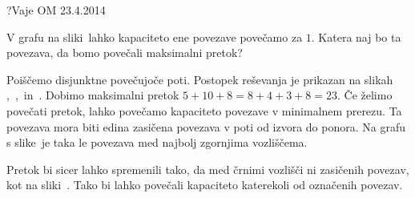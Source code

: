 \begin{naloga}{?}{Vaje OM 23.4.2014}
\begin{vprasanje}
V grafu na sliki~\fig lahko kapaciteto ene povezave povečamo za $1$.
Katera naj bo ta povezava, da bomo povečali maksimalni pretok?

\begin{slika}
\pgfslika
{}
\end{slika}
\end{vprasanje}

\begin{odgovor}
Poiščemo disjunktne povečujoče poti.
Postopek reševanja je prikazan na slikah~%
\fig[pretok4a],~\fig[pretok4b],~\fig[pretok4c] in~\fig[pretok4d].
Dobimo maksimalni pretok $5+10+8 = 8+4+3+8 = 23$.
Če želimo povečati pretok,
lahko povečamo kapaciteto povezave v minimalnem prerezu.
Ta povezava mora biti edina zasičena povezava v poti od izvora do ponora.
Na grafu s slike~\fig[pretok4d]
je taka le povezava med najbolj zgornjima vozliščema.

Pretok bi sicer lahko spremenili tako,
da med črnimi vozlišči ni zasičenih povezav, kot na sliki~\fig[pretok4e].
Tako bi lahko povečali kapaciteto katerekoli od označenih povezav.

\begin{slika}
\pgfslika[pretok4a]
\end{slika}
\begin{slika}
\pgfslika[pretok4b]
\end{slika}
\begin{slika}
\pgfslika[pretok4c]
\end{slika}
\begin{slika}
\pgfslika[pretok4d]
\end{slika}
\begin{slika}
\pgfslika[pretok4e]
\end{slika}
\end{odgovor}
\end{naloga}
